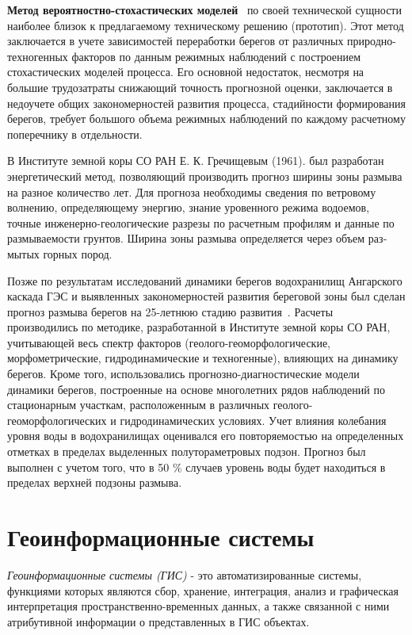 \documentclass[732,14pt,final]{studrep}
\begin{document}
\textbf{Метод вероятностно-стохастических моделей}~\cite{b20} по своей технической сущности наиболее близок к предлагаемому техническому решению (прототип). Этот метод заключается в учете зависимостей переработки берегов от различных природно-техногенных факторов по данным режимных наблюдений с построением стохастических моделей процесса. Его основной недостаток, несмотря на большие трудозатраты снижающий точность прогнозной оценки, заключается в недоучете общих закономерностей развития процесса, стадийности формирования берегов, требует большого объема режимных наблюдений по каждому расчетному поперечнику в отдельности.

В Институте земной коры СО РАН Е. К. Гречищевым (1961). был разработан энергетический метод, позволяющий производить прогноз ширины зоны размыва на разное количество лет. Для прогноза необходимы сведения по ветровому волнению, определяющему энергию, знание уровенного режима водоемов, точные инженерно-геологические разрезы по расчетным профи­лям и данные по размываемости грунтов. Ширина зоны размыва определяется через объем раз­мытых горных пород.

Позже по результатам исследований динамики берегов водохранилищ Ангарского каскада ГЭС и выявленных закономерностей развития береговой зоны был сделан прогноз размыва берегов на 25-летнюю стадию развития~\cite{ovch99}. Расчеты производились по методике, разработанной в Институте земной коры СО РАН, учитывающей весь спектр факторов (геолого-геоморфологические, морфометрические, гидродинамические и техногенные), влияющих на динамику берегов. Кроме того, использовались прогнозно-диагностические модели динамики берегов, построенные на основе многолетних рядов наблюдений по стационарным участкам, расположенным в различных геолого-геоморфологических и гидродинамических условиях. Учет влияния колебания уровня воды в водохранилищах оценивался его повторяемостью на определенных отметках в пределах выделенных полутораметровых подзон. Прогноз был выполнен с учетом того, что в 50 \% случаев уровень воды будет находиться в пределах верхней подзоны размыва.

\section{Геоинформационные системы}


\emph{Геоинформационные системы (ГИС)} - это автоматизированные системы, функциями которых являются сбор, хранение, интеграция, анализ и графическая интерпретация пространственно-временных данных, а также связанной с ними атрибутивной информации о представленных в ГИС объектах.
\end{document}
